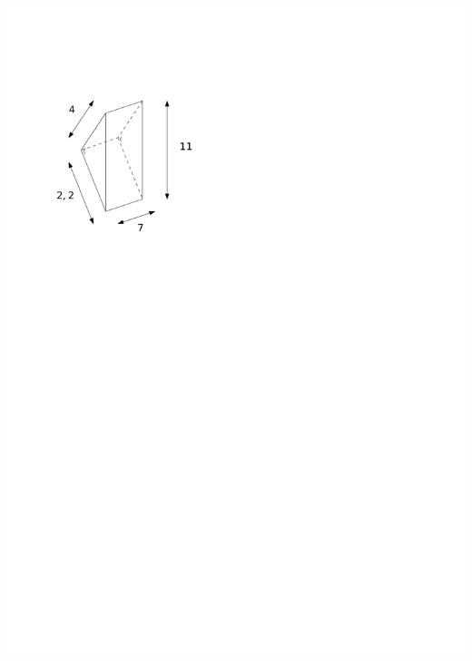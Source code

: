 \documentclass[a4paper,11pt]{report}
\begin{document}
\begin{exop}
{\begin{tasks}
    \task ~\\ \includegraphics[scale=0.5]{media/gm-02/prisme-triang3.pdf}

\end{tasks}}
\end{exop}
\end{document}
